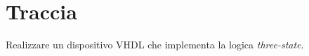 %

\section{Traccia}

Realizzare un dispositivo VHDL che implementa la logica \textit{three-state}.%

